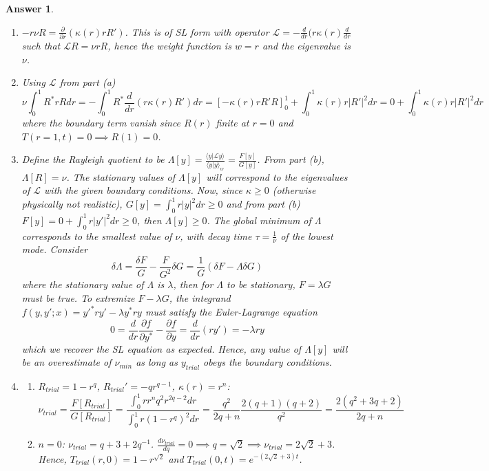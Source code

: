 \documentclass[a4paper]{article}
\newtheorem{ans}{Answer}[section]
\theoremstyle{new}
\begin{document}
\begin{ans}\leavevmode
\begin{enumerate}[label=(\alph*)]
\item $-r\nu R=\frac{\partial}{\partial r}(\kappa(r)rR')$. This is of SL form with operator $\mathcal{L}=-\frac{d}{dr}(r\kappa(r)\frac{d}{dr}$ such that $\mathcal{L}R=\nu rR$, hence the weight function is $w=r$ and the eigenvalue is $\nu$.
\item Using $\mathcal{L}$ from part (a) 
$$\nu\int_0^1R^*r Rdr=-\int_0^1R^*\frac{d}{dr}(r\kappa(r) R')dr=[-\kappa (r)rR'R]_0^1+\int_0^1\kappa(r)r|R'|^2dr=0+\int_0^1\kappa(r)r|R'|^2dr$$
where the boundary term vanish since $R(r)$ finite at $r=0$ and $T(r=1,t)=0\implies R(1)=0$.
\item Define the Rayleigh quotient to be $\Lambda[y]=\frac{\langle y|\mathcal{L}y\rangle}{\langle y|y\rangle_w}=\frac{F[y]}{G[y]}$. From part (b), $\Lambda[R]=\nu$. The stationary values of $\Lambda[y]$ will correspond to the eigenvalues of $\mathcal{L}$ with the given boundary conditions. Now, since $\kappa\geq 0$ (otherwise physically not realistic), $G[y]=\int_0^1r|y|^2dr\geq0$ and from part (b) $F[y]=0+\int_0^1r|y'|^2dr\geq0$, then $\Lambda[y]\geq0$. The global minimum of $\Lambda$ corresponds to the smallest value of $\nu$, with decay time $\tau=\frac{1}{\nu}$ of the lowest mode. Consider
$$\delta\Lambda=\frac{\delta F}{G}-\frac{F}{G^2}\delta G=\frac{1}{G}(\delta F-\Lambda\delta G)$$
where the stationary value of $\Lambda$ is $\lambda$, then for $\Lambda$ to be stationary, $F=\lambda G$ must be true. To extremize $F-\lambda G$, the integrand $f(y,y';x)=y'^*ry'-\lambda y^*ry$ must satisfy the Euler-Lagrange equation
$$0=\frac{d}{dr}\frac{\partial f}{\partial y^*}-\frac{\partial f}{\partial y}=\frac{d}{dr}(ry')=-\lambda ry$$
which we recover the SL equation as expected. Hence, any value of $\Lambda[y]$ will be an overestimate of $\nu_{min}$ as long as $y_{trial}$ obeys the boundary conditions.
\item
\begin{enumerate}[label=(\roman*)]
\item $R_{trial}=1-r^q$, $R_{trial}'=-qr^{q-1}$, $\kappa(r)=r^n$:
$$\nu_{trial}=\frac{F[R_{trial}]}{G[R_{trial}]}=\frac{\int_0^1rr^nq^2r^{2q-2}dr}{\int_0^1r(1-r^q)^2dr}=\frac{q^2}{2q+n}\frac{2(q+1)(q+2)}{q^2}=\frac{2(q^2+3q+2)}{2q+n}$$
\item $n=0$: $\nu_{trial}=q+3+2q^{-1}$. $\frac{d\nu_{trial}}{dq}=0\implies q=\sqrt{2}\implies\nu_{trial}=2\sqrt{2}+3$. Hence, $T_{trial}(r,0)=1-r^{\sqrt{2}}$ and $T_{trial}(0,t)=e^{-(2\sqrt{2}+3)t}$.
\end{enumerate}
\end{enumerate}
\end{ans}
\newpage
\end{document}
